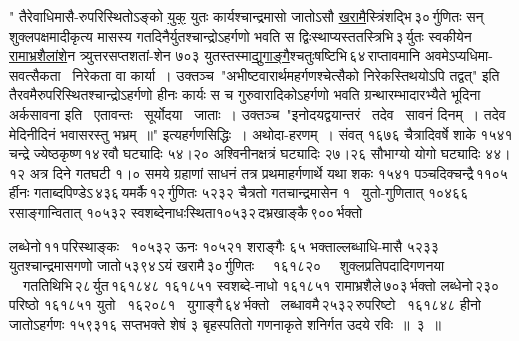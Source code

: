 \documentclass[11pt, openany]{book}
\begin{document}
\newpage

" तैरेवाधिमासै-रुपरिस्थितोऽङ्को \hyperref[1.2]{युक्} युतः कार्यश्चान्द्रमासो जातोऽसौ \hyperref[1.3]{खरामै}स्त्रिंशद्भि\textendash \,३०\textendash \,र्गुणितः सन् शुक्लपक्षमादीकृत्य मासस्य गतदिनैर्युतश्चान्द्रोऽहर्गणो भवति स द्विःस्थाप्यस्ततस्त्रिभि\textendash \,३\textendash \,र्युतः स्वकीयेन \hyperref[1.3]{रामाभ्रशैलांशे}न त्र्युत्तरसप्तशतां-शेन ७०३ युतस्तस्मा\hyperref[1.3]{द्युगाङ्गै}श्चतुःषष्टिभि\textendash \,६४\textendash \,राप्तावमानि अवमेऽप्यधिमा-सवत्सैकता ~निरेकता \;वा \;कार्या~। उक्तञ्च\textendash ~"{\color{violet}अभीष्टवारार्थमहर्गणश्चेत्सैको निरेकस्तिथयोऽपि तद्वत्}" इति तैरवमैरुपरिस्थितश्चान्द्रोऽहर्गणो हीनः कार्यः स च गुरुवारादिकोऽहर्गणो भवति ग्रन्थारम्भादारभ्यैते भूदिना अर्कसावना इति ~एतावन्तः ~सूर्योदया ~जाताः~। उक्तञ्च\textendash ~"{\color{violet}इनोदयद्वयान्तरं ~तदेव ~सावनं दिनम्~। तदेव मेदिनीदिनं भवासरस्तु {भ}भ्रम्}~॥" इत्यहर्गणसिद्धिः~। अथोदा-हरणम्~। संवत् १६७६ चैत्रादिवर्षे शाके १५४१ चन्द्रे ज्येष्ठकृष्ण\textendash \,१४\textendash \,रवौ घट्यादिः ५४।२० अश्विनीनक्षत्रं घट्यादिः २७।२६ सौभाग्यो योगो घट्यादिः ४४।१२ अत्र दिने गतघटी १।० समये ग्रहाणां साधनं तत्र प्रथमाहर्गणार्थे यथा शकः १५४१ पञ्चदिक्चन्द्रै\textendash \,११०५\textendash \,र्हीनः गताब्दपिण्डेऽ\textendash \,४३६\textendash \,यमर्कै\textendash \,१२\textendash \,र्गुणितः ५२३२ चैत्रतो गतचान्द्रमासेन १ ~युतो-गुणितात् \;१०४६६ \;रसाङ्गान्वितात् \;१०५३२ \;स्वशब्देनाधःस्थिता\textendash \;१०५३२\textendash \,दभ्रखाङ्कै\textendash \,९००\textendash \,र्भक्तो

\newpage

\noindent लब्धेनो\textendash \,११\textendash \,परिस्थाङ्कः ~१०५३२ ऊनः १०५२१ शराङ्गैः ६५ भक्ताल्लब्धाधि-मासै ५२३३ युतश्चान्द्रमासगणो जातो\textendash \,५३९४\textendash \,ऽयं खरामै\textendash \,३०\textendash \,र्गुणितः ~~१६१८२० ~~शुक्लप्रतिपदादिगणनया ~~गततिथिभि\textendash \,२८\textendash \,र्युत\textendash \,१६१८४८ १६१८५१ स्वशब्दे-नाधो १६१८५१ रामाभ्रशैले\textendash \,७०३\textendash \,र्भक्तो लब्धेनो\textendash \,२३०\textendash \,परिष्ठो १६१८५१ युतो ~१६२०८१ ~युगाङ्गै\textendash \,६४\textendash \,र्भक्तो ~लब्धावमै\textendash \,२५३२\textendash \,रुपरिष्टो ~१६१८४८ हीनो जातोऽहर्गणः १५९३१६ सप्तभक्ते शेषं ३ बृहस्पतितो गणनाकृते शनिर्गत उदये रविः~॥~३~॥\\
\end{document}
